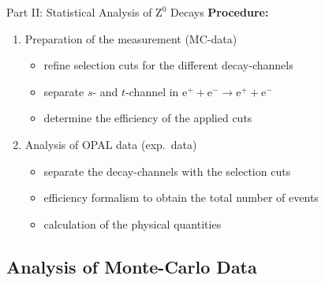 \documentclass[11pt,xcolor=dvipsnames,professionalfonts]{beamer}
\begin{document}
\begin{frame}{Part II: Statistical Analysis of $\mathrm{Z}^0$ Decays}
	\textbf{Procedure:}
	\begin{enumerate}
		\setlength\itemsep{2.em}
		\item Preparation of the measurement (MC-data)
		\begin{itemize}
			\setlength\itemsep{0.5em}
			\item refine selection cuts for the different decay-channels
			
			\item separate $s$- and $t$-channel in $\mathrm{e}^+ + \mathrm{e}^- \rightarrow \mathrm{e}^+ + \mathrm{e}^-$
			
			\item determine the efficiency of the applied cuts
		\end{itemize}
		
		\item Analysis of OPAL data (exp.\ data)
		\begin{itemize}
			\setlength\itemsep{0.5em}
			\item separate the decay-channels with the selection cuts
			
			\item efficiency formalism to obtain the total number of events
			
			\item calculation of the physical quantities
		\end{itemize}
	\end{enumerate}
\end{frame}

\subsection{Analysis of Monte-Carlo Data}
\end{document}
